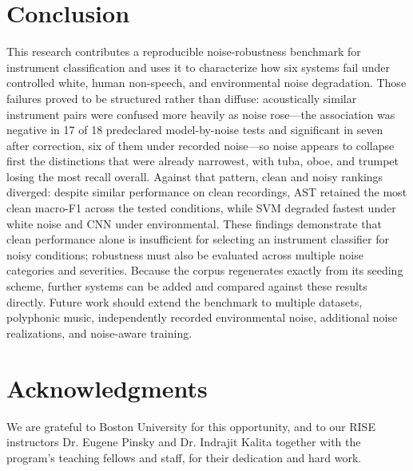 \documentclass[conference]{IEEEtran}
\begin{document}
\section{Conclusion}
This research contributes a reproducible noise-robustness benchmark for instrument classification and uses it to characterize how six systems fail under controlled white, human non-speech, and environmental noise degradation. Those failures proved to be structured rather than diffuse: acoustically similar instrument pairs were confused more heavily as noise rose---the association was negative in 17 of 18 predeclared model-by-noise tests and significant in seven after correction, six of them under recorded noise---so noise appears to collapse first the distinctions that were already narrowest, with tuba, oboe, and trumpet losing the most recall overall. Against that pattern, clean and noisy rankings diverged: despite similar performance on clean recordings, AST retained the most clean macro-F1 across the tested conditions, while SVM degraded fastest under white noise and CNN under environmental. These findings demonstrate that clean performance alone is insufficient for selecting an instrument classifier for noisy conditions; robustness must also be evaluated across multiple noise categories and severities. Because the corpus regenerates exactly from its seeding scheme, further systems can be added and compared against these results directly. Future work should extend the benchmark to multiple datasets, polyphonic music, independently recorded environmental noise, additional noise realizations, and noise-aware training.

\section*{Acknowledgments}
We are grateful to Boston University for this opportunity, and to our RISE instructors Dr. Eugene Pinsky and Dr. Indrajit Kalita together with the program's teaching fellows and staff, for their dedication and hard work.
\end{document}
